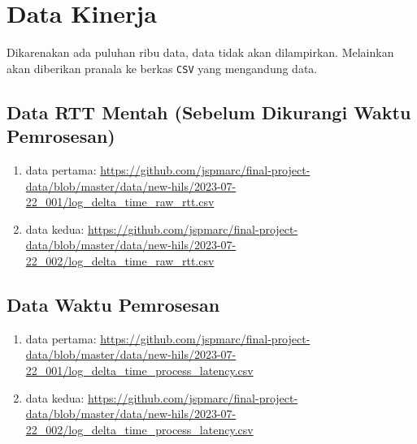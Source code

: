 \chapter{Data Kinerja}\label{appendix-performance-data}
\setcounter{section}{0}

Dikarenakan ada puluhan ribu data, data tidak akan dilampirkan. Melainkan
akan diberikan pranala ke berkas \texttt{CSV} yang mengandung data.

\section{Data RTT Mentah (Sebelum Dikurangi Waktu Pemrosesan)}

\begin{enumerate}
	\item data pertama:
		\url{https://github.com/jspmarc/final-project-data/blob/master/data/new-hils/2023-07-22_001/log_delta_time_raw_rtt.csv}
	\item data kedua:
		\url{https://github.com/jspmarc/final-project-data/blob/master/data/new-hils/2023-07-22_002/log_delta_time_raw_rtt.csv}
\end{enumerate}

\section{Data Waktu Pemrosesan}

\begin{enumerate}
	\item data pertama:
		\url{https://github.com/jspmarc/final-project-data/blob/master/data/new-hils/2023-07-22_001/log_delta_time_process_latency.csv}
	\item data kedua:
		\url{https://github.com/jspmarc/final-project-data/blob/master/data/new-hils/2023-07-22_002/log_delta_time_process_latency.csv}
\end{enumerate}
